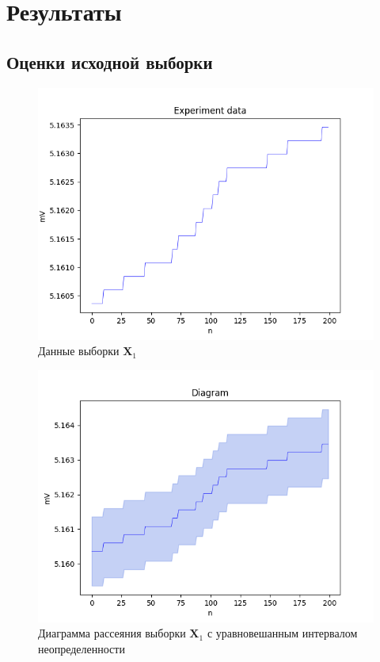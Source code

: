 \section{Результаты}

\subsection{Оценки исходной выборки} 

\begin{figure}[H]
	\begin{center}
		\includegraphics[scale = 0.55]{data.png}
	\end{center}
	\caption{Данные выборки $\bm{X}_1$}
\end{figure}

\begin{figure}[H]
	\begin{center}
		\includegraphics[scale = 0.55]{diagram_beta_None.png}
	\end{center}
	\caption{Диаграмма рассеяния выборки $\bm{X}_1$ с уравновешанным интервалом неопределенности}
\end{figure}

